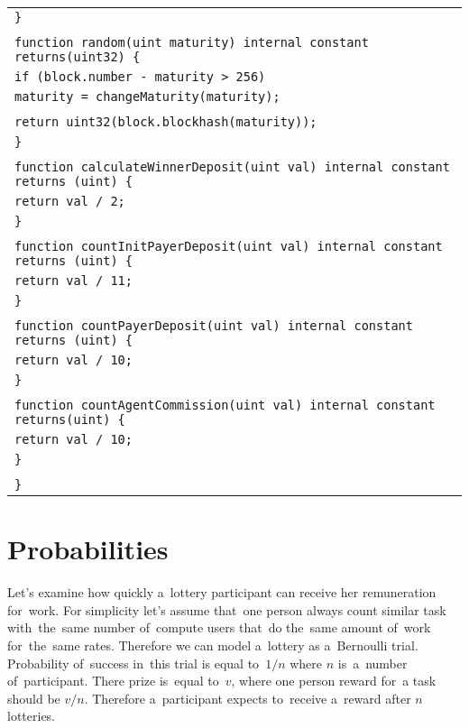 \documentclass[a4paper]{article}
\begin{document}
\begin{tabularx}{\linewidth}{l}
        \qquad\texttt{\}}\\
        \\
        \qquad\texttt{function random(uint maturity) internal constant returns(uint32) \{}\\
        \qquad\qquad\texttt{if (block.number - maturity > 256)}\\
        \qquad\qquad\qquad\texttt{maturity = changeMaturity(maturity);}\\
        \\
        \qquad\qquad\texttt{return uint32(block.blockhash(maturity));}\\
        \qquad\texttt{\}}\\
        \\
        \qquad\texttt{function calculateWinnerDeposit(uint val) internal constant returns (uint) \{}\\
        \qquad\qquad\texttt{return val / 2;}\\
        \qquad\texttt{\}}\\
        \\
        \qquad\texttt{function countInitPayerDeposit(uint val) internal constant returns (uint) \{}\\
        \qquad\qquad\texttt{return val / 11;}\\
        \qquad\texttt{\}}\\
        \\
        \qquad\texttt{function countPayerDeposit(uint val) internal constant returns (uint) \{}\\
        \qquad\qquad\texttt{return val / 10;}\\
        \qquad\texttt{\}}\\
        \\
        \qquad\texttt{function countAgentCommission(uint val) internal constant returns(uint) \{}\\
        \qquad\qquad\texttt{return val / 10;}\\
        \qquad\texttt{\}}\\
        \\
        \texttt{\}}\\
    \end{tabularx}

\section{Probabilities}

    Let's examine how quickly a~lottery participant can receive her remuneration for~work. For simplicity let's assume
    that~one person always count similar task with~the~same number of~compute users that~do the~same amount of~work
    for~the~same rates. Therefore we can model a~lottery as a~Bernoulli trial. Probability of~success in~this trial is
    equal to~$1/n$ where $n$ is~a~number of~participant. There prize is~equal to~$v$, where one person reward for~a
    task should be $v/n$. Therefore a~participant expects to~receive a~reward after $n$ lotteries.
\end{document}
